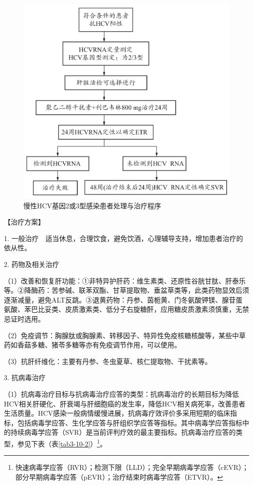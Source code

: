 \begin{figure}[!htbp]
 \centering
 \includegraphics{./images/Image00099.jpg}
 \captionsetup{justification=centering}
 \caption{慢性HCV基因2或3型感染患者处理与治疗程序}
 \label{fig3-10-3}
  \end{figure} 

【治疗方案】

1.
一般治疗　适当休息，合理饮食，避免饮酒，心理辅导支持，增加患者治疗的依从性。

2. 药物及相关治疗

（1）改善和恢复肝功能：①非特异护肝药：维生素类、还原性谷胱甘肽、肝泰乐等。②降酶药：苦参碱、联苯双酯、甘草提取物、垂盆草类等，此类药物显效后须逐渐减量，避免ALT反跳。③退黄药物：丹参、茵栀黄、门冬氨酸钾镁、腺苷蛋氨酸、苯巴比妥类、皮质激素类、低分子右旋糖酐，应用糖皮质激素须慎重，无禁忌证时选用。

（2）免疫调节：胸腺肽或胸腺素、转移因子、特异性免疫核糖核酸等，某些中草药如香菇多糖、猪苓多糖等亦有免疫调节作用，可以使用。

（3）抗肝纤维化：主要有丹参、冬虫夏草、核仁提取物、干扰素等。

3. 抗病毒治疗

（1）抗病毒治疗目标与抗病毒治疗应答的类型：抗病毒治疗的长期目标为降低HCV相关肝硬化、肝衰竭与肝细胞癌的发生率，降低HCV相关病死率，改善患者生活质量。HCV感染一般病情缓慢进展，抗病毒疗效评价多采用短期的临床指标，包括病毒学应答、生化学应答与肝组织学应答等指标。其中病毒学应答指标中的持续病毒学应答（SVR）是当前评判疗效的最主要指标。抗病毒治疗应答的类型，参见下表（表\ref{tab3-10-2}）\footnote{快速病毒学应答（RVR）；检测下限（LLD）；完全早期病毒学应答（cEVR）；部分早期病毒学应答（pEVR）；治疗结束时病毒学应答（ETVR）。}。

